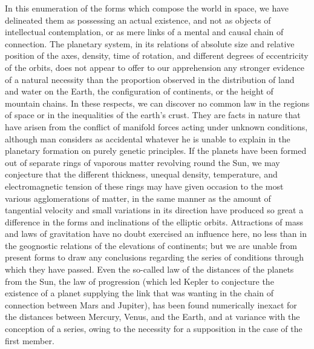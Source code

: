 In this enumeration of the forms which compose the world in space, we have delineated them as possessing an actual existence, and not as objects of intellectual contemplation, or as mere links of a mental and causal chain of connection. The planetary system, in its relations of absolute size and relative position of the axes, density, time of rotation, and different degrees of eccentricity of the orbits, does not appear to offer to our apprehension any stronger evidence of a natural necessity than the proportion observed in the distribution of land and water on the Earth, the configuration of continents, or the height of mountain chains. In these respects, we can discover no common law in the regions of space or in the inequalities of the earth's crust. They are facts in nature that have arisen from the conflict of manifold forces acting under unknown conditions, although man considers as accidental whatever he is unable to explain in the planetary formation on purely genetic principles. If the planets have been formed out of separate rings of vaporous matter revolving round the Sun, we may conjecture that the different thickness, unequal density, temperature, and electromagnetic tension of these rings may have given occasion to the most various agglomerations of matter, in the same manner as the amount of tangential velocity and small variations in its direction have produced so great a difference in the forms and inclinations of the elliptic orbits. Attractions of mass and laws of gravitation have no doubt exercised an influence here, no less than in the geognostic relations of the elevations of continents; but we are unable from present forms to draw any conclusions regarding the series of conditions through which they have passed. Even the so-called law of the distances of the planets from the Sun, the law of progression (which led Kepler to conjecture the existence of a planet supplying the link that was wanting in the chain of connection between Mars and Jupiter), has been found numerically inexact for the distances between Mercury, Venus, and the Earth, and at variance with the conception of a series, owing to the necessity for a supposition in the case of the first member.
